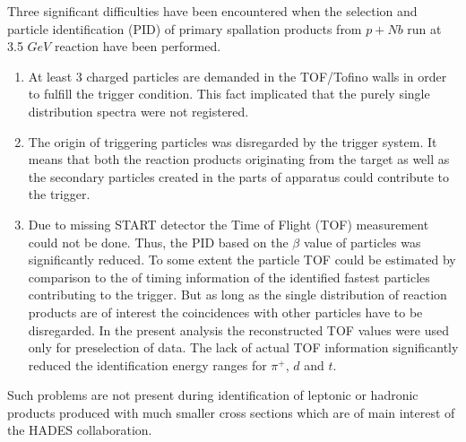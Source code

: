 Three significant difficulties have been encountered when the selection and particle identification (PID)  
of primary spallation products from $p+Nb$ run at 3.5 $GeV$ reaction have been performed.
\begin{enumerate}
	\item At least 3 charged particles are demanded in the TOF/Tofino walls in order to fulfill the trigger condition. 
	This fact implicated that the purely single distribution spectra were not registered. 
	\item The origin of triggering particles was disregarded by the trigger system. 
	It means that both the reaction products originating from the target 
	as well as the secondary particles created in the parts of apparatus could contribute to the trigger.
	\item Due to missing START detector the Time of Flight (TOF) measurement could not be done. 
	Thus, the PID based on the $\beta$ value of particles was significantly reduced. 
    To some extent the particle TOF could be estimated by comparison to the of timing information 
    of the identified fastest particles contributing to the trigger. But as long as the single distribution 
    of reaction products are of interest the coincidences with other particles have to be disregarded.
    In the present analysis the reconstructed TOF values were used only for preselection of data. 
    The lack of actual TOF information significantly reduced the identification energy ranges for $\pi{^+}$, $d$ and $t$.	
\end{enumerate}

Such problems are not present during identification of leptonic or hadronic products 
produced with much smaller cross sections which are of main interest of the HADES collaboration.  



